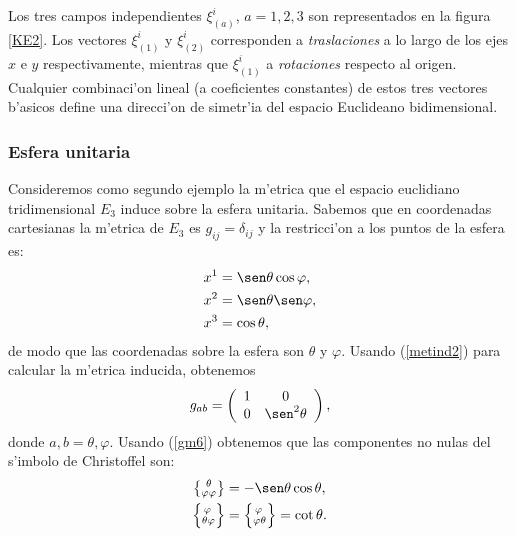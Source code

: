 Los tres campos independientes $\xi^i_{(a)}$, $a=1,2,3$ son representados en la figura \ref{KE2}. Los vectores $\xi^i_{(1)}$ y $\xi^i_{(2)}$ corresponden a \textit{traslaciones} a lo largo de los ejes $x$ e $y$ respectivamente, mientras que $\xi^i_{(1)}$ a \textit{rotaciones} respecto al origen. Cualquier combinaci'on lineal (a coeficientes constantes) de estos tres vectores b'asicos define una direcci'on de simetr'ia del espacio Euclideano bidimensional.
\subsubsection{Esfera unitaria}

Consideremos como segundo ejemplo la m'etrica que el espacio euclidiano
tridimensional $E_{3}$ induce sobre la esfera unitaria. Sabemos que en
coordenadas cartesianas la m'etrica de $E_{3}$ es $g_{ij}=\delta_{ij}$ y la restricci'on a los puntos de la esfera es:
\begin{align}
x^1  &  =\sen\theta\cos\varphi,\\
x^2  &  =\sen\theta\sen\varphi,\\
x^{3}  &  =\cos\theta,
\end{align}
de modo que las coordenadas sobre la esfera son $\theta$ y $\varphi$. Usando
(\ref{metind2}) para calcular la m'etrica inducida, obtenemos
\begin{equation}
g_{ab}=\left(
\begin{array}[c]{cc}
1 & 0\\
0 & \sen^2\theta
\end{array}\right) ,  \label{ind7}
\end{equation}
donde $a,b=\theta,\varphi$. Usando (\ref{gm6}) obtenemos que las componentes no
nulas del s'imbolo de Christoffel son:
\begin{align}
\left\{  _{\varphi\varphi}^{\ \theta}\right\}  &  =-\sen\theta\cos\theta,\label{ind8}\\
\left\{  _{\theta\varphi}^{\, \varphi}\right\}   &  =\left\{  _{\varphi\theta}^{\,\varphi}\right\}  =\cot\theta.
\end{align}


